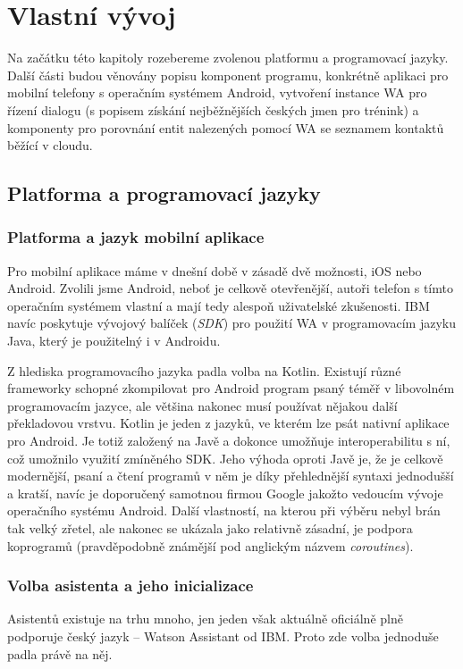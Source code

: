 \chapter{Vlastní vývoj}

Na začátku této kapitoly rozebereme zvolenou platformu a programovací jazyky.
Další části budou věnovány popisu komponent programu, konkrétně aplikaci pro
mobilní telefony s operačním systémem Android, vytvoření instance WA pro řízení
dialogu (s popisem získání nejběžnějších českých jmen pro trénink) a komponenty
pro porovnání entit nalezených pomocí WA se seznamem kontaktů běžící v cloudu.

\section{Platforma a programovací jazyky}

\subsection{Platforma a jazyk mobilní aplikace}
Pro mobilní aplikace máme v dnešní době v zásadě dvě možnosti, iOS nebo Android.
Zvolili jsme Android, neboť je celkově otevřenější, autoři telefon s tímto
operačním systémem vlastní a mají tedy alespoň uživatelské zkušenosti. IBM navíc
poskytuje vývojový balíček (\textit{SDK}) pro použití WA v programovacím
jazyku Java, který je použitelný i v Androidu.

Z hlediska programovacího jazyka padla volba na Kotlin. Existují různé frameworky
schopné zkompilovat pro Android program psaný téměř v libovolném programovacím
jazyce, ale většina nakonec musí používat nějakou další překladovou vrstvu.
Kotlin je jeden z jazyků, ve kterém lze psát nativní aplikace pro Android. Je
totiž založený na Javě a dokonce umožňuje interoperabilitu s ní, což umožnilo
využití zmíněného SDK. Jeho výhoda oproti Javě je, že je celkově modernější,
psaní a čtení programů v něm je díky přehlednější syntaxi jednodušší a kratší,
navíc je doporučený samotnou firmou Google jakožto vedoucím vývoje operačního
systému Android. Další vlastností, na kterou při výběru nebyl brán tak velký
zřetel, ale nakonec se ukázala jako relativně zásadní, je podpora koprogramů
(pravděpodobně známější pod anglickým názvem \textit{coroutines}).

\subsection{Volba asistenta a jeho inicializace}
Asistentů existuje na trhu mnoho, jen jeden však aktuálně oficiálně plně
podporuje český jazyk -- Watson Assistant od IBM. Proto zde volba jednoduše
padla právě na něj.

